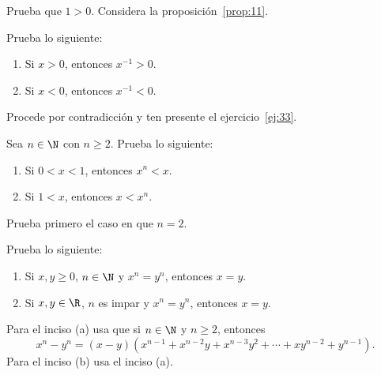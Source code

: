 \documentclass[12pt,a4paper]{book}
\begin{document}
    \begin{ejercicio}\label{ej:33}
        Prueba que $1>0$. \sugerencia Considera la proposición~\ref{prop:11}.
    \end{ejercicio}

    \begin{ejercicio}\label{ej:34}
        Prueba lo siguiente:
        \begin{enumerate}[nosep]
            \item Si $x>0$, entonces $x^{-1}>0$.
            \item Si $x<0$, entonces $x^{-1}<0$.
        \end{enumerate}
        \sugerencia Procede por contradicción y ten presente el ejercicio~\ref{ej:33}.
    \end{ejercicio}

    \begin{ejercicio}\label{ej:35}
        Sea $n\in\N$ con $n\geq 2$. Prueba lo siguiente:
        \begin{enumerate}[nosep]
            \item Si $0<x<1$, entonces $x^{n}<x$.
            \item Si $1<x$, entonces $x<x^{n}$.
        \end{enumerate}
        \sugerencia Prueba primero el caso en que $n=2$.
    \end{ejercicio}

    \begin{ejercicio}[Unicidad de las raíces $n$-ésimas; inyectividad\protect\footnote{Estudiaremos a las funciones inyectivas en la sección~\ref{sec:inyectivas}.} de la función $x^{n}$ en ${[0,\infty)}$ para $n$ par y en $\R$ para $n$ impar]\label{ej:36}
        Prueba lo siguiente:
        \begin{enumerate}[nosep]
            \item Si $x,y\geq 0$, $n\in\N$ y $x^{n}=y^{n}$, entonces $x=y$.
            \item Si $x,y\in\R$, $n$ es impar y $x^{n}=y^{n}$, entonces $x=y$.
        \end{enumerate}
        \sugerencia Para el inciso (a) usa que si $n\in\N$ y $n\geq 2$, entonces
        \begin{equation*}
            x^{n}-y^{n}=(x-y)\left(x^{n-1}+x^{n-2}y+x^{n-3}y^{2}+\cdots+xy^{n-2}+y^{n-1}\right).
        \end{equation*}
        Para el inciso (b) usa el inciso (a).
    \end{ejercicio}
\end{document}
